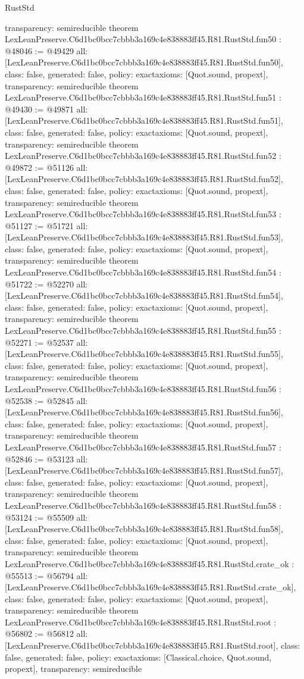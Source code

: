\begin{lexlean}{RustStd}
\begin{coremodule}
{  transparency: semireducible
}
theorem LexLeanPreserve.C6d1bc0bcc7cbbb3a169c4e838883ff45.R81.RustStd.fun50 : @48046 := @49429 {
  all: [LexLeanPreserve.C6d1bc0bcc7cbbb3a169c4e838883ff45.R81.RustStd.fun50],
  class: false,
  generated: false,
  policy: exact{axioms: [Quot.sound, propext]},
  transparency: semireducible
}
theorem LexLeanPreserve.C6d1bc0bcc7cbbb3a169c4e838883ff45.R81.RustStd.fun51 : @49430 := @49871 {
  all: [LexLeanPreserve.C6d1bc0bcc7cbbb3a169c4e838883ff45.R81.RustStd.fun51],
  class: false,
  generated: false,
  policy: exact{axioms: [Quot.sound, propext]},
  transparency: semireducible
}
theorem LexLeanPreserve.C6d1bc0bcc7cbbb3a169c4e838883ff45.R81.RustStd.fun52 : @49872 := @51126 {
  all: [LexLeanPreserve.C6d1bc0bcc7cbbb3a169c4e838883ff45.R81.RustStd.fun52],
  class: false,
  generated: false,
  policy: exact{axioms: [Quot.sound, propext]},
  transparency: semireducible
}
theorem LexLeanPreserve.C6d1bc0bcc7cbbb3a169c4e838883ff45.R81.RustStd.fun53 : @51127 := @51721 {
  all: [LexLeanPreserve.C6d1bc0bcc7cbbb3a169c4e838883ff45.R81.RustStd.fun53],
  class: false,
  generated: false,
  policy: exact{axioms: [Quot.sound, propext]},
  transparency: semireducible
}
theorem LexLeanPreserve.C6d1bc0bcc7cbbb3a169c4e838883ff45.R81.RustStd.fun54 : @51722 := @52270 {
  all: [LexLeanPreserve.C6d1bc0bcc7cbbb3a169c4e838883ff45.R81.RustStd.fun54],
  class: false,
  generated: false,
  policy: exact{axioms: [Quot.sound, propext]},
  transparency: semireducible
}
theorem LexLeanPreserve.C6d1bc0bcc7cbbb3a169c4e838883ff45.R81.RustStd.fun55 : @52271 := @52537 {
  all: [LexLeanPreserve.C6d1bc0bcc7cbbb3a169c4e838883ff45.R81.RustStd.fun55],
  class: false,
  generated: false,
  policy: exact{axioms: [Quot.sound, propext]},
  transparency: semireducible
}
theorem LexLeanPreserve.C6d1bc0bcc7cbbb3a169c4e838883ff45.R81.RustStd.fun56 : @52538 := @52845 {
  all: [LexLeanPreserve.C6d1bc0bcc7cbbb3a169c4e838883ff45.R81.RustStd.fun56],
  class: false,
  generated: false,
  policy: exact{axioms: [Quot.sound, propext]},
  transparency: semireducible
}
theorem LexLeanPreserve.C6d1bc0bcc7cbbb3a169c4e838883ff45.R81.RustStd.fun57 : @52846 := @53123 {
  all: [LexLeanPreserve.C6d1bc0bcc7cbbb3a169c4e838883ff45.R81.RustStd.fun57],
  class: false,
  generated: false,
  policy: exact{axioms: [Quot.sound, propext]},
  transparency: semireducible
}
theorem LexLeanPreserve.C6d1bc0bcc7cbbb3a169c4e838883ff45.R81.RustStd.fun58 : @53124 := @55509 {
  all: [LexLeanPreserve.C6d1bc0bcc7cbbb3a169c4e838883ff45.R81.RustStd.fun58],
  class: false,
  generated: false,
  policy: exact{axioms: [Quot.sound, propext]},
  transparency: semireducible
}
theorem LexLeanPreserve.C6d1bc0bcc7cbbb3a169c4e838883ff45.R81.RustStd.crate_ok : @55513 := @56794 {
  all: [LexLeanPreserve.C6d1bc0bcc7cbbb3a169c4e838883ff45.R81.RustStd.crate_ok],
  class: false,
  generated: false,
  policy: exact{axioms: [Quot.sound, propext]},
  transparency: semireducible
}
theorem LexLeanPreserve.C6d1bc0bcc7cbbb3a169c4e838883ff45.R81.RustStd.root : @56802 := @56812 {
  all: [LexLeanPreserve.C6d1bc0bcc7cbbb3a169c4e838883ff45.R81.RustStd.root],
  class: false,
  generated: false,
  policy: exact{axioms: [Classical.choice, Quot.sound, propext]},
  transparency: semireducible
}


\end{coremodule}
\end{lexlean}
